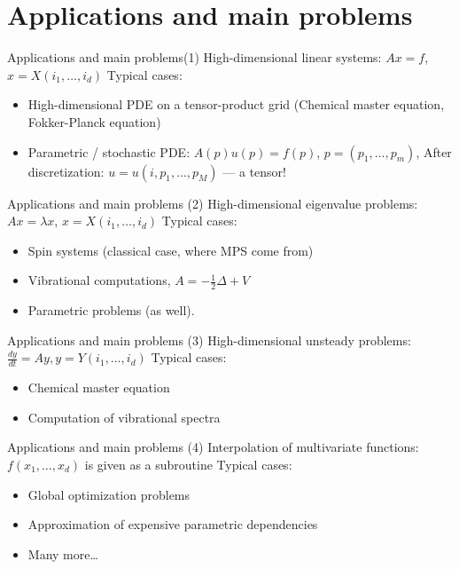 \documentclass{beamer}[14pt, presentation]
\begin{document}
\section{Applications and main problems}
\label{sec-6}
\begin{frame}[label=sec-6-1]{Applications and main problems(1)}
High-dimensional linear systems:
\vskip 2mm
\alert{
$Ax = f$, $x = X(i_1, \ldots, i_d)$
}
\vskip 2mm
Typical cases:
\begin{itemize}
\item High-dimensional PDE on a tensor-product grid (Chemical master
equation, Fokker-Planck equation)
\item Parametric / stochastic PDE:
\vskip 2mm
$A(p) u(p) = f(p)$, $p = (p_1, \ldots, p_m)$, 
\vskip 2mm
After discretization:  
\vskip 2mm
$u = u(i, p_1, \ldots, p_M)$ --- a tensor!
\end{itemize}
\end{frame}
\begin{frame}[label=sec-6-2]{Applications and main problems (2)}
High-dimensional eigenvalue problems:
\vskip 2mm
\alert{
$Ax = \lambda x$, $x = X(i_1, \ldots, i_d)$}
\vskip 2mm
Typical cases:
\begin{itemize}
\item Spin systems (classical case, where MPS come from)
\item Vibrational computations, $A = -\frac{1}{2} \Delta + V$
\item Parametric problems (as well).
\end{itemize}
\end{frame}
\begin{frame}[label=sec-6-3]{Applications and main problems (3)}
High-dimensional unsteady problems:
\vskip 2mm
\alert{$\frac{dy}{dt} = Ay, y = Y(i_1, \ldots, i_d)$}
\vskip 2mm
Typical cases:
\begin{itemize}
\item Chemical master equation
\item Computation of vibrational spectra
\end{itemize}
\end{frame}
\begin{frame}[label=sec-6-4]{Applications and main problems (4)}
Interpolation of multivariate functions:
\vskip 2mm
$f(x_1, \ldots, x_d)$ is given as a subroutine
\vskip 2mm
Typical cases:
\begin{itemize}
\item Global optimization problems
\item Approximation of expensive parametric dependencies
\item Many more\ldots{}
\end{itemize}
\end{frame}
\end{document}
